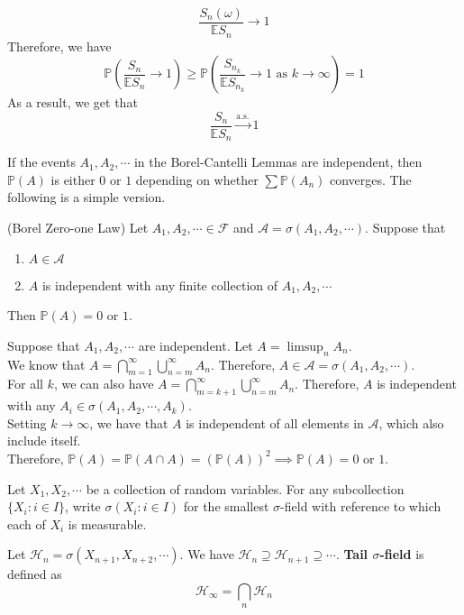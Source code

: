 \documentclass{huhtakm-template-book}
\newcommand{\prob}{\mathbb{P}}
\newcommand{\expect}{\mathbb{E}}
\begin{document}
\begin{proofing}
	\begin{equation*}
		\frac{S_{n}(\omega)}{\expect S_{n}}\to 1
	\end{equation*}
	Therefore, we have
	\begin{equation*}
		\prob\left(\frac{S_{n}}{\expect S_{n}}\to 1\right)\geq\prob\left(\frac{S_{n_{k}}}{\expect S_{n_{k}}}\to 1\text{ as }k\to\infty\right)=1
	\end{equation*}
	As a result, we get that
	\begin{equation*}
		\frac{S_{n}}{\expect S_{n}}\xrightarrow{\text{a.s.}}1
	\end{equation*}
\end{proofing}
If the events $A_{1}, A_{2},\cdots$ in the Borel-Cantelli Lemmas are independent, then $\prob(A)$ is either $0$ or $1$ depending on whether $\sum\prob(A_{n})$ converges. The following is a simple version.
\begin{thm}(Borel Zero-one Law)
	Let $A_{1},A_{2},\cdots\in\mathcal{F}$ and $\mathcal{A}=\sigma(A_{1},A_{2},\cdots)$. Suppose that
	\begin{enumerate}
		\item $A\in\mathcal{A}$
		\item $A$ is independent with any finite collection of $A_{1},A_{2},\cdots$
	\end{enumerate}
	Then $\prob(A)=0$ or $1$.
\end{thm}
\begin{proofing}
	Suppose that $A_{1},A_{2},\cdots$ are independent. Let $A=\limsup_{n}A_{n}$.\\
	We know that $A=\bigcap_{m=1}^{\infty}\bigcup_{n=m}^{\infty}A_{n}$. Therefore, $A\in\mathcal{A}=\sigma(A_{1},A_{2},\cdots)$.\\
	For all $k$, we can also have $A=\bigcap_{m=k+1}^{\infty}\bigcup_{n=m}^{\infty}A_{n}$. Therefore, $A$ is independent with any $A_{i}\in\sigma(A_{1},A_{2},\cdots,A_{k})$.\\
	Setting $k\to\infty$, we have that $A$ is independent of all elements in $\mathcal{A}$, which also include itself.\\
	Therefore, $\prob(A)=\prob(A\cap A)=(\prob(A))^{2}\implies\prob(A)=0$ or $1$.
\end{proofing}
\newpage
Let $X_{1},X_{2},\cdots$ be a collection of random variables. For any subcollection $\{X_{i}:i\in I\}$, write $\sigma(X_{i}:i\in I)$ for the smallest $\sigma$-field with reference to which each of $X_{i}$ is measurable.
\begin{defn}
	Let $\mathcal{H}_{n}=\sigma(X_{n+1},X_{n+2},\cdots)$. We have $\mathcal{H}_{n}\supseteq\mathcal{H}_{n+1}\supseteq\cdots$. \textbf{Tail $\sigma$-field} is defined as
	\begin{equation*}
		\mathcal{H}_{\infty}=\bigcap_{n}\mathcal{H}_{n}
	\end{equation*}
\end{defn}
\end{document}

